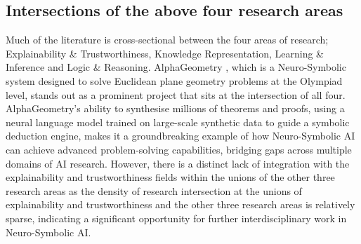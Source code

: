\documentclass[hf]{ceurart}
\begin{document}
\subsection{Intersections of the above four research areas}
Much of the literature is cross-sectional between the four areas of research; Explainability \& Trustworthiness, Knowledge Representation, Learning \& Inference and Logic \& Reasoning. AlphaGeometry \cite{Trinh2024}, which is a Neuro-Symbolic system designed to solve Euclidean plane geometry problems at the Olympiad level, stands out as a prominent project that sits at the intersection of all four. AlphaGeometry's ability to synthesise millions of theorems and proofs, using a neural language model trained on large-scale synthetic data to guide a symbolic deduction engine, makes it a groundbreaking example of how Neuro-Symbolic AI can achieve advanced problem-solving capabilities, bridging gaps across multiple domains of AI research. However, there is a distinct lack of integration with the explainability and trustworthiness fields within the unions of the other three research areas as the density of research intersection at the unions of explainability and trustworthiness and the other three research areas is relatively sparse, indicating a significant opportunity for further interdisciplinary work in Neuro-Symbolic AI.
\end{document}
